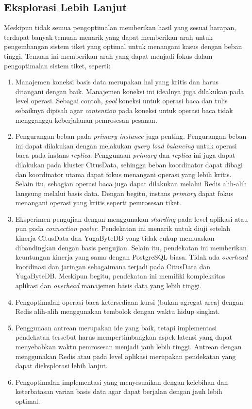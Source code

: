 \subsection{Eksplorasi Lebih Lanjut}
\label{pengembangan-lebih-lanjut}

Meskipun tidak semua pengoptimalan memberikan hasil yang sesuai harapan, terdapat banyak temuan menarik yang dapat memberikan arah untuk pengembangan sistem tiket yang optimal untuk menangani kasus dengan beban tinggi. Temuan ini memberikan arah yang dapat menjadi fokus dalam pengoptimalan sistem tiket, seperti:

\begin{enumerate}
    \item Manajemen koneksi basis data merupakan hal yang kritis dan harus ditangani dengan baik. Manajemen koneksi ini idealnya juga dilakukan pada level operasi. Sebagai contoh, \textit{pool} koneksi untuk operasi baca dan tulis sebaiknya dipisah agar \textit{contention} pada koneksi untuk operasi baca tidak mengganggu keberjalanan pemrosesan pesanan.
    \item Pengurangan beban pada \textit{primary instance} juga penting. Pengurangan beban ini dapat dilakukan dengan melakukan \textit{query load balancing} untuk operasi baca pada instans \textit{replica}. Penggunaan \textit{primary} dan \textit{replica} ini juga dapat dilakukan pada kluster CitusData, sehingga beban koordinator dapat dibagi dan koordinator utama dapat fokus menangani operasi yang lebih kritis. Selain itu, sebagian operasi baca juga dapat dilakukan melalui Redis alih-alih langsung melalui basis data. Dengan begitu, instans \textit{primary} dapat fokus menangani operasi yang kritis seperti pemrosesan tiket.
    \item Eksperimen pengujian dengan menggunakan \textit{sharding} pada level aplikasi atau pun pada \textit{connection pooler}. Pendekatan ini menarik untuk diuji setelah kinerja CitusData dan YugaByteDB yang tidak cukup memuaskan dibandingkan dengan basis pengujian. Selain itu, pendekatan ini memberikan keuntungan kinerja yang sama dengan PostgreSQL biasa. Tidak ada \textit{overhead} koordinasi dan jaringan sebagaimana terjadi pada CitusData dan YugaByteDB. Meskipun begitu, pendekatan ini memiliki kompleksitas aplikasi dan \textit{overhead} manajemen basis data yang lebih tinggi.
    \item Pengoptimalan operasi baca ketersediaan kursi (bukan agregat area) dengan Redis alih-alih menggunakan tembolok dengan waktu hidup singkat.
    \item Penggunaan antrean merupakan ide yang baik, tetapi implementasi pendekatan tersebut harus mempertimbangkan aspek latensi yang dapat menyebabkan waktu pemrosesan menjadi jauh lebih tinggi. Antrean dengan menggunakan Redis atau pada level aplikasi merupakan pendekatan yang dapat dieksplorasi lebih lanjut.
    \item Pengoptimalan implementasi yang menyesuaikan dengan kelebihan dan keterbatasan varian basis data agar dapat berjalan dengan jauh lebih optimal.
\end{enumerate}

